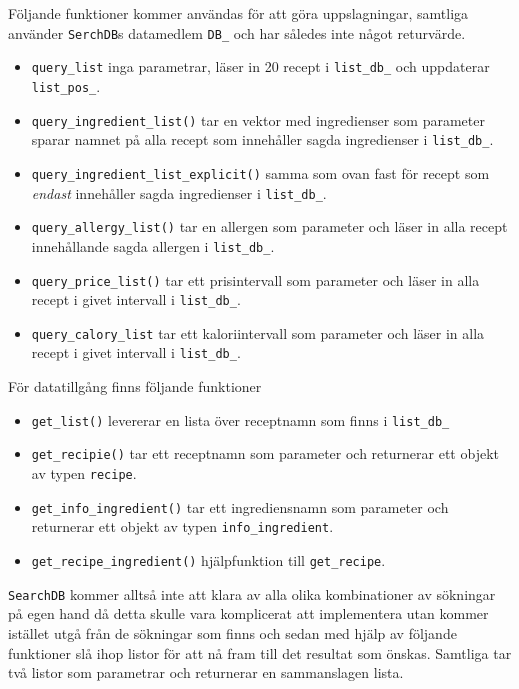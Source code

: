 Följande funktioner kommer användas för att göra uppslagningar, samtliga
använder \verb+SerchDB+s datamedlem \verb+DB_+ och har således inte något
returvärde.

  \begin{itemize}
    \item \verb+query_list+ inga parametrar, läser in 20 recept i
      \verb+list_db_+ och uppdaterar \verb+list_pos_+.
    \item \verb+query_ingredient_list()+ tar en vektor med ingredienser som
      parameter sparar namnet på alla recept som innehåller sagda ingredienser i
      \verb+list_db_+.
    \item \verb+query_ingredient_list_explicit()+ samma som ovan fast för recept
      som \emph{endast} innehåller sagda ingredienser i \verb+list_db_+.
    \item \verb+query_allergy_list()+ tar en allergen som parameter och läser in
      alla recept innehållande sagda allergen i \verb+list_db_+.
    \item \verb+query_price_list()+ tar ett prisintervall som parameter och
      läser in alla recept i givet intervall i \verb+list_db_+.
    \item \verb+query_calory_list+ tar ett kaloriintervall som parameter och
      läser in alla recept i givet intervall i \verb+list_db_+.
  \end{itemize}
 

För datatillgång finns följande funktioner

\begin{itemize}
\item \verb+get_list()+ levererar en lista över receptnamn som finns i
  \verb+list_db_+
\item \verb+get_recipie()+ tar ett receptnamn som parameter och returnerar ett
  objekt av typen \verb+recipe+.
\item \verb+get_info_ingredient()+ tar ett ingrediensnamn som parameter och
  returnerar ett objekt av typen \verb+info_ingredient+.
\item \verb+get_recipe_ingredient()+ hjälpfunktion till \verb+get_recipe+.
\end{itemize}

\verb+SearchDB+ kommer alltså inte att klara av alla olika kombinationer av sökningar på
egen hand då detta skulle vara komplicerat att implementera utan kommer istället
utgå från de sökningar som finns och sedan med hjälp av följande funktioner slå
ihop listor för att nå fram till det resultat som önskas. Samtliga tar två
listor som parametrar och returnerar en sammanslagen lista.

